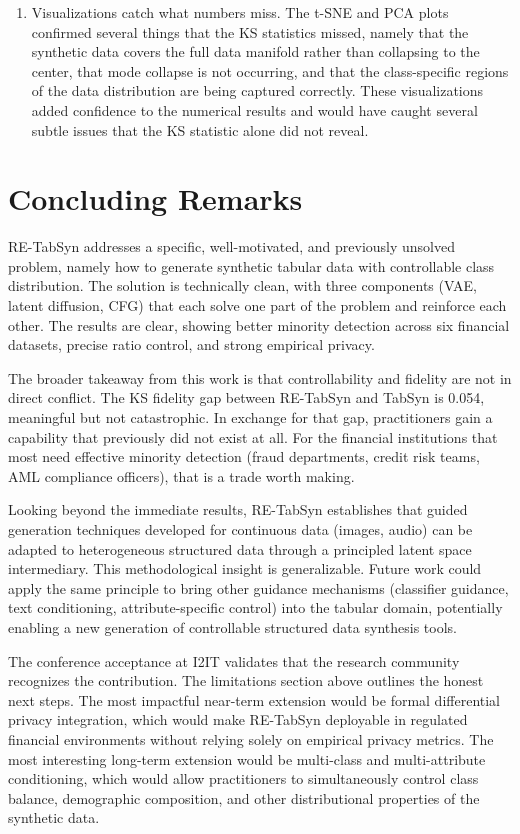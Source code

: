 \begin{enumerate}
    \item Visualizations catch what numbers miss. The t-SNE and PCA plots confirmed several things that the KS statistics missed, namely that the synthetic data covers the full data manifold rather than collapsing to the center, that mode collapse is not occurring, and that the class-specific regions of the data distribution are being captured correctly. These visualizations added confidence to the numerical results and would have caught several subtle issues that the KS statistic alone did not reveal.
\end{enumerate}

\section{Concluding Remarks}

RE-TabSyn addresses a specific, well-motivated, and previously unsolved problem, namely how to generate synthetic tabular data with controllable class distribution. The solution is technically clean, with three components (VAE, latent diffusion, CFG) that each solve one part of the problem and reinforce each other. The results are clear, showing better minority detection across six financial datasets, precise ratio control, and strong empirical privacy.

The broader takeaway from this work is that controllability and fidelity are not in direct conflict. The KS fidelity gap between RE-TabSyn and TabSyn is 0.054, meaningful but not catastrophic. In exchange for that gap, practitioners gain a capability that previously did not exist at all. For the financial institutions that most need effective minority detection (fraud departments, credit risk teams, AML compliance officers), that is a trade worth making.

Looking beyond the immediate results, RE-TabSyn establishes that guided generation techniques developed for continuous data (images, audio) can be adapted to heterogeneous structured data through a principled latent space intermediary. This methodological insight is generalizable. Future work could apply the same principle to bring other guidance mechanisms (classifier guidance, text conditioning, attribute-specific control) into the tabular domain, potentially enabling a new generation of controllable structured data synthesis tools.

The conference acceptance at I2IT validates that the research community recognizes the contribution. The limitations section above outlines the honest next steps. The most impactful near-term extension would be formal differential privacy integration, which would make RE-TabSyn deployable in regulated financial environments without relying solely on empirical privacy metrics. The most interesting long-term extension would be multi-class and multi-attribute conditioning, which would allow practitioners to simultaneously control class balance, demographic composition, and other distributional properties of the synthetic data.

